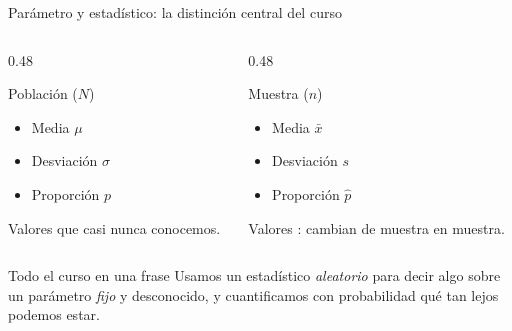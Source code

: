 \documentclass[aspectratio=169,10pt]{beamer}
\begin{document}
\begin{frame}{Parámetro y estadístico: la distinción central del curso}
  \begin{columns}[T,onlytextwidth]
    \begin{column}{0.48\textwidth}
      \begin{block}{Población ($N$)}
        \footnotesize
        \begin{itemize}
          \item Media $\mu$
          \item Desviación $\sigma$
          \item Proporción $p$
        \end{itemize}
        Valores  que casi nunca conocemos.
      \end{block}
    \end{column}
    \begin{column}{0.48\textwidth}
      \begin{exampleblock}{Muestra ($n$)}
        \footnotesize
        \begin{itemize}
          \item Media $\bar{x}$
          \item Desviación $s$
          \item Proporción $\hat{p}$
        \end{itemize}
        Valores : cambian de muestra en muestra.
      \end{exampleblock}
    \end{column}
  \end{columns}

  \vspace{0.3cm}
  \begin{alertblock}{Todo el curso en una frase}
    \footnotesize
    Usamos un estadístico \emph{aleatorio} para decir algo sobre un parámetro
    \emph{fijo} y desconocido, y cuantificamos con probabilidad qué tan lejos
    podemos estar. 
  \end{alertblock}
\end{frame}
\end{document}
